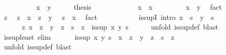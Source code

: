 \begin{isabellebody}
\ \ \isamarkupfalse%
\ {\isacharminus}\isanewline
\ \ \ \ \isamarkupfalse%
\ {\isachardoublequoteopen}x\ {\isasymsqsubseteq}\ y{\isachardoublequoteclose}\isanewline
\ \ \ \ \isamarkupfalse%
\ {\isacharquery}thesis\isanewline
\ \ \ \ \isamarkupfalse%
\isanewline
\ \ \ \ \ \ \isamarkupfalse%
\ {\isachardoublequoteopen}x\ {\isasymsqsubseteq}\ x{\isachardoublequoteclose}\ \isacommand{{\isachardot}{\isachardot}}\isamarkupfalse%
\isanewline
\ \ \ \ \ \ \isamarkupfalse%
\ {\isachardoublequoteopen}x\ {\isasymsqsubseteq}\ y{\isachardoublequoteclose}\ \isamarkupfalse%
\ fact\isanewline
\ \ \ \ \ \ \isamarkupfalse%
\ z\ \isamarkupfalse%
\ {\isachardoublequoteopen}z\ {\isasymsqsubseteq}\ x{\isachardoublequoteclose}\ \ {\isachardoublequoteopen}z\ {\isasymsqsubseteq}\ y{\isachardoublequoteclose}\ \isamarkupfalse%
\ {\isachardoublequoteopen}z\ {\isasymsqsubseteq}\ x{\isachardoublequoteclose}\ \isamarkupfalse%
\ fact\isanewline
\ \ \ \ \isamarkupfalse%
\isanewline
\ \ \isamarkupfalse%
\isanewline
\isanewline
\ \ \isamarkupfalse%
\ is{\isacharunderscore}supI\ {\isacharbrackleft}intro{\isacharquery}{\isacharbrackright}{\isacharcolon}\ {\isachardoublequoteopen}x\ {\isasymsqsubseteq}\ s\ {\isasymLongrightarrow}\ y\ {\isasymsqsubseteq}\ s\ {\isasymLongrightarrow}\isanewline
\ \ \ \ \ \ {\isacharparenleft}{\isasymAnd}z{\isachardot}\ x\ {\isasymsqsubseteq}\ z\ {\isasymLongrightarrow}\ y\ {\isasymsqsubseteq}\ z\ {\isasymLongrightarrow}\ s\ {\isasymsqsubseteq}\ z{\isacharparenright}\ {\isasymLongrightarrow}\ is{\isacharunderscore}sup\ x\ y\ s{\isachardoublequoteclose}\isanewline
\ \ \ \ \isamarkupfalse%
\ {\isacharparenleft}unfold\ is{\isacharunderscore}sup{\isacharunderscore}def{\isacharparenright}\ blast\isanewline
\isanewline
\ \ \isamarkupfalse%
\ is{\isacharunderscore}sup{\isacharunderscore}least\ {\isacharbrackleft}elim{\isacharquery}{\isacharbrackright}{\isacharcolon}\isanewline
\ \ \ \ \ \ {\isachardoublequoteopen}is{\isacharunderscore}sup\ x\ y\ s\ {\isasymLongrightarrow}\ x\ {\isasymsqsubseteq}\ z\ {\isasymLongrightarrow}\ y\ {\isasymsqsubseteq}\ z\ {\isasymLongrightarrow}\ s\ {\isasymsqsubseteq}\ z{\isachardoublequoteclose}\isanewline
\ \ \ \ \isamarkupfalse%
\ {\isacharparenleft}unfold\ is{\isacharunderscore}sup{\isacharunderscore}def{\isacharparenright}\ blast\isanewline

\end{isabellebody}
